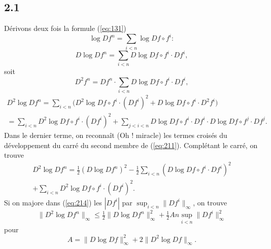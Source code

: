 \documentclass[12pt]{amsart}
\theoremstyle{plain}
\theoremstyle{remark}
\begin{document}
\subsection*{2.1}
D\'{e}rivons deux fois la formule (\ref{eq:131})
\[
\log Df^{n} = \sum_{i < n} \log Df \circ f^{i} :
\]
\begin{equation}\label{eq:211}
D\log Df^{n} = \sum_{i < n} D\log Df \circ f^{i} \cdot Df^{i} ,
\end{equation}
soit
\begin{equation}\label{eq:212}
D^{2}f^{n} = Df^{n} \cdot \sum_{i < n} D\log Df \circ f^{i} \cdot Df^{i} ,
\end{equation}
\begin{multline}\label{eq:213}
D^{2}\log Df^{n} = \sum_{i < n} \bigl(D^{2}\log Df \circ f^{i} \cdot (Df^{i})^{2} + D\log Df \circ f^{i} \cdot D^{2}f^{i}\bigr) \\
= \sum_{i < n} D^{2}\log Df \circ f^{i} \cdot (Df^{i})^{2} + \sum_{j < i < n} D\log Df \circ f^{i} \cdot Df^{i} \cdot D\log Df \circ f^{j} \cdot Df^{j} .
\end{multline}
Dans le dernier terme, on reconna\^{i}t (Oh ! miracle) les termes crois\'{e}s du d\'{e}veloppement du carr\'{e} du second membre de (\ref{eq:211}). Compl\'{e}tant le carr\'{e}, on trouve
\begin{multline}\label{eq:214}
D^{2}\log Df^{n} = \tfrac{1}{2}(D\log Df^{n})^{2} - \tfrac{1}{2} \sum_{i < n} (D\log Df \circ f^{i} \cdot Df^{i})^{2} \\
+ \sum_{i < n} D^{2}\log Df \circ f^{i} \cdot (Df^{i})^{2} .
\end{multline}
Si on majore dans (\ref{eq:214}) les $|Df^{i}|$ par $\sup_{i < n} \|Df^{i}\|_{\infty}$, on trouve
\begin{equation}\label{eq:215}
\|D^{2}\log Df^{n}\|_{\infty} \leq \tfrac{1}{2}\|D\log Df^{n}\|_{\infty}^{2} + \tfrac{1}{2}An \sup_{i < n} \|Df^{i}\|_{\infty}^{2}
\end{equation}
pour
\begin{equation}\label{eq:216}
A = \|D\log Df\|_{\infty}^{2} + 2\|D^{2}\log Df\|_{\infty} .
\end{equation}
\end{document}
